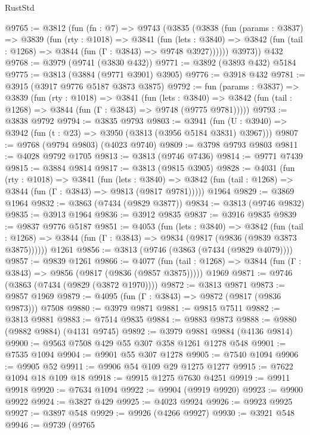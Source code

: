 \begin{lexlean}{RustStd}
\begin{coremodule}
{\begin{coremodule}
{{{{{{{{{{{{{{{{{{{{{{{{{{{{{{{{{{{@9765 := @3812
    (fun (fn : @7) =>
    @9743
      (@3835
        (@3838
          (fun (params : @3837) =>
          @3839
            (fun (rty : @1018) =>
            @3841
              (fun (lets : @3840) =>
              @3842 (fun (tail : @1268) => @3844 (fun (Γ : @3843) => @9748 @3927))))))
        @3973))
    @432
@9768 := @3979 (@9741 (@3830 @432))
@9771 := @3892 (@3893 @432) @5184
@9775 := @3813 (@3884 (@9771 @3901) @3905)
@9776 := @3918 @432
@9781 := @3915 (@3917 @9776 @5187 @3873 @3875)
@9792 := fun (params : @3837) =>
  @3839
    (fun (rty : @1018) =>
    @3841
      (fun (lets : @3840) =>
      @3842 (fun (tail : @1268) => @3844 (fun (Γ : @3843) => @9748 (@9775 @9781)))))
@9793 := @3838 @9792
@9794 := @3835 @9793
@9803 := @3941 (fun (U : @3940) => @3942 (fun (t : @23) => @3950 (@3813 (@3956 @5184 @3831) @3967)))
@9807 := @9768 (@9794 @9803) (@4023 @9740)
@9809 := @3798 @9793 @9803
@9811 := @4028 @9792 @1705
@9813 := @3813 (@9746 @7436)
@9814 := @9771 @7439
@9815 := @3884 @9814
@9817 := @3813 (@9815 @3905)
@9828 := @4031
    (fun (rty : @1018) =>
    @3841
      (fun (lets : @3840) =>
      @3842 (fun (tail : @1268) => @3844 (fun (Γ : @3843) => @9813 (@9817 @9781)))))
    @1964
@9829 := @3869 @1964
@9832 := @3863 (@7434 (@9829 @3877))
@9834 := @3813 (@9746 @9832)
@9835 := @3913 @1964
@9836 := @3912 @9835
@9837 := @3916 @9835
@9839 := @9837 @9776 @5187
@9851 := @4053
    (fun (lets : @3840) =>
    @3842
      (fun (tail : @1268) => @3844 (fun (Γ : @3843) => @9834 (@9817 (@9836 (@9839 @3873 @3875))))))
    @1261
@9856 := @3813 (@9746 (@3863 (@7434 (@9829 @4079))))
@9857 := @9839 @1261
@9866 := @4077
    (fun (tail : @1268) => @3844 (fun (Γ : @3843) => @9856 (@9817 (@9836 (@9857 @3875)))))
    @1969
@9871 := @9746 (@3863 (@7434 (@9829 (@3872 @1970))))
@9872 := @3813 @9871
@9873 := @9857 @1969
@9879 := @4095 (fun (Γ : @3843) => @9872 (@9817 (@9836 @9873))) @7508
@9880 := @3979 @9871
@9881 := @9815 @7511
@9882 := @3813 @9881
@9883 := @7514 @9835
@9884 := @9883 @9873
@9888 := @9880 (@9882 @9884) (@4131 @9745)
@9892 := @3979 @9881 @9884 (@4136 @9814)
@9900 := @9563 @7508 @429 @55 @307 @358 @1261 @1278 @548
@9901 := @7535 @1094
@9904 := @9901 @55 @307 @1278
@9905 := @7540 @1094
@9906 := @9905 @52
@9911 := @9906 @54 @109 @29 @1275 @1277
@9915 := @7622 @1094 @18 @109 @18
@9918 := @9915 @1275 @7630 @4251
@9919 := @9911 @9918
@9920 := @7634 @1094
@9922 := @9904 (@9919 @9920)
@9923 := @9900 @9922
@9924 := @3827 @429
@9925 := @4023 @9924
@9926 := @9923 @9925
@9927 := @3897 @548
@9929 := @9926 (@4266 @9927)
@9930 := @3921 @548
@9946 := @9739
    (@9765
}}}}}}}}}}}}}}}}}}}}}}}}}}}}}}}}}}}
\end{coremodule}}
\end{coremodule}
\end{lexlean}
